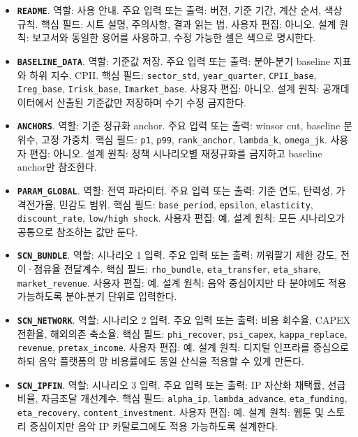 \documentclass[11pt,a4paper]{report}
\newenvironment{summarylist}{\begin{itemize}[leftmargin=1.8em,itemsep=0.35em,topsep=0.35em]\RaggedRight}{\end{itemize}}
\begin{document}
\begingroup
\footnotesize
\begin{summarylist}
  \item \textbf{\texttt{README}}. 역할: 사용 안내. 주요 입력 또는 출력: 버전, 기준 기간, 계산 순서, 색상 규칙. 핵심 필드: 시트 설명, 주의사항, 결과 읽는 법. 사용자 편집: 아니오. 설계 원칙: 보고서와 동일한 용어를 사용하고, 수정 가능한 셀은 색으로 명시한다.
  \item \textbf{\texttt{BASELINE\_DATA}}. 역할: 기준값 저장. 주요 입력 또는 출력: 분야-분기 baseline 지표와 하위 지수, CPII. 핵심 필드: \texttt{sector\_std}, \texttt{year\_quarter}, \texttt{CPII\_base}, \texttt{Ireg\_base}, \texttt{Irisk\_base}, \texttt{Imarket\_base}. 사용자 편집: 아니오. 설계 원칙: 공개데이터에서 산출된 기준값만 저장하며 수기 수정 금지한다.
  \item \textbf{\texttt{ANCHORS}}. 역할: 기준 정규화 anchor. 주요 입력 또는 출력: winsor cut, baseline 분위수, 고정 가중치. 핵심 필드: \texttt{p1}, \texttt{p99}, \texttt{rank\_anchor}, \texttt{lambda\_k}, \texttt{omega\_jk}. 사용자 편집: 아니오. 설계 원칙: 정책 시나리오별 재정규화를 금지하고 baseline anchor만 참조한다.
  \item \textbf{\texttt{PARAM\_GLOBAL}}. 역할: 전역 파라미터. 주요 입력 또는 출력: 기준 연도, 탄력성, 가격전가율, 민감도 범위. 핵심 필드: \texttt{base\_period}, \texttt{epsilon}, \texttt{elasticity}, \texttt{discount\_rate}, \texttt{low/high shock}. 사용자 편집: 예. 설계 원칙: 모든 시나리오가 공통으로 참조하는 값만 둔다.
  \item \textbf{\texttt{SCN\_BUNDLE}}. 역할: 시나리오 1 입력. 주요 입력 또는 출력: 끼워팔기 제한 강도, 전이·점유율 전달계수. 핵심 필드: \texttt{rho\_bundle}, \texttt{eta\_transfer}, \texttt{eta\_share}, \texttt{market\_revenue}. 사용자 편집: 예. 설계 원칙: 음악 중심이지만 타 분야에도 적용 가능하도록 분야-분기 단위로 입력한다.
  \item \textbf{\texttt{SCN\_NETWORK}}. 역할: 시나리오 2 입력. 주요 입력 또는 출력: 비용 회수율, CAPEX 전환율, 해외의존 축소율. 핵심 필드: \texttt{phi\_recover}, \texttt{psi\_capex}, \texttt{kappa\_replace}, \texttt{revenue}, \texttt{pretax\_income}. 사용자 편집: 예. 설계 원칙: 디지털 인프라를 중심으로 하되 음악 플랫폼의 망 비용률에도 동일 산식을 적용할 수 있게 만든다.
  \item \textbf{\texttt{SCN\_IPFIN}}. 역할: 시나리오 3 입력. 주요 입력 또는 출력: IP 자산화 채택률, 선급비율, 자금조달 개선계수. 핵심 필드: \texttt{alpha\_ip}, \texttt{lambda\_advance}, \texttt{eta\_funding}, \texttt{eta\_recovery}, \texttt{content\_investment}. 사용자 편집: 예. 설계 원칙: 웹툰 및 스토리 중심이지만 음악 IP 카탈로그에도 적용 가능하도록 설계한다.

\end{summarylist}
\end{document}
